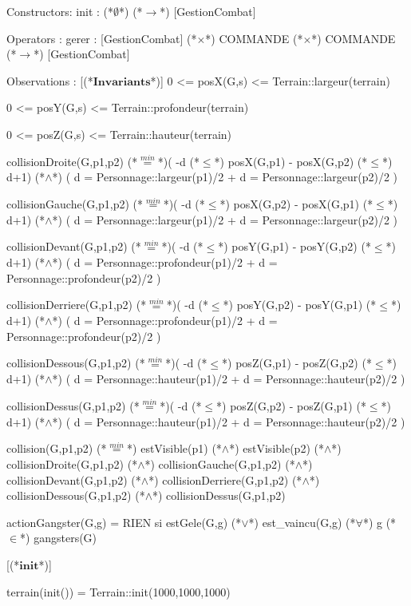 \documentclass[a4paper, 11pt]{report}
\newcommand{\specB}[1]{\textbf{#1}}
\begin{document}
\begin{landscape}
\begin{Spe}
Constructors:
      init : (*$\emptyset$*) (*$\rightarrow$*) [GestionCombat]
      
Operators :
      gerer : [GestionCombat] (*$\times$*) COMMANDE (*$\times$*) COMMANDE (*$\rightarrow$*) [GestionCombat]

Observations : 
      [(*$\specB{Invariants}$*)]
      	0 <= posX(G,s) <= Terrain::largeur(terrain)
	
      	0 <= posY(G,s) <= Terrain::profondeur(terrain)
	
      	0 <= posZ(G,s) <= Terrain::hauteur(terrain)
	
	collisionDroite(G,p1,p2) (*$\stackrel{min}{=}$*)( -d (*$\le$*) posX(G,p1) - posX(G,p2) (*$\le$*) d+1) (*$\land$*) ( d = Personnage::largeur(p1)/2 + d = Personnage::largeur(p2)/2 )

	collisionGauche(G,p1,p2) (*$\stackrel{min}{=}$*)( -d (*$\le$*) posX(G,p2) - posX(G,p1) (*$\le$*) d+1) (*$\land$*) ( d = Personnage::largeur(p1)/2 + d = Personnage::largeur(p2)/2 )

	collisionDevant(G,p1,p2) (*$\stackrel{min}{=}$*)( -d (*$\le$*) posY(G,p1) - posY(G,p2) (*$\le$*) d+1) (*$\land$*) ( d = Personnage::profondeur(p1)/2 + d = Personnage::profondeur(p2)/2 )

	collisionDerriere(G,p1,p2) (*$\stackrel{min}{=}$*)( -d (*$\le$*) posY(G,p2) - posY(G,p1) (*$\le$*) d+1) (*$\land$*) ( d = Personnage::profondeur(p1)/2 + d = Personnage::profondeur(p2)/2 )

	collisionDessous(G,p1,p2) (*$\stackrel{min}{=}$*)( -d (*$\le$*) posZ(G,p1) - posZ(G,p2) (*$\le$*) d+1) (*$\land$*) ( d = Personnage::hauteur(p1)/2 + d = Personnage::hauteur(p2)/2 )

	collisionDessus(G,p1,p2) (*$\stackrel{min}{=}$*)( -d (*$\le$*) posZ(G,p2) - posZ(G,p1) (*$\le$*) d+1) (*$\land$*) ( d = Personnage::hauteur(p1)/2 + d = Personnage::hauteur(p2)/2 )

	collision(G,p1,p2) (*$\stackrel{min}{=}$*) estVisible(p1) (*$\land$*) estVisible(p2) 
		(*$\land$*) collisionDroite(G,p1,p2) (*$\land$*) collisionGauche(G,p1,p2) 
		(*$\land$*) collisionDevant(G,p1,p2) (*$\land$*) collisionDerriere(G,p1,p2)
		(*$\land$*) collisionDessous(G,p1,p2) (*$\land$*) collisionDessus(G,p1,p2) 
	
	actionGangster(G,g) = RIEN si estGele(G,g) (*$\lor$*) est_vaincu(G,g) (*$\forall$*) g (*$\in$*) gangsters(G)

      [(*$\specB{init}$*)]
    
	terrain(init()) = Terrain::init(1000,1000,1000)
	

\end{Spe}
\end{landscape}
\end{document}

